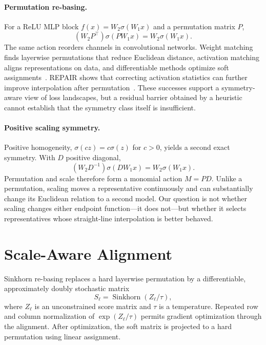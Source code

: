 \documentclass{article}
\begin{document}
\paragraph{Permutation re-basing.}
For a ReLU MLP block $f(x)=W_2\sigma(W_1x)$ and a permutation matrix $P$,
\begin{equation}
(W_2P^\top)\sigma(PW_1x)=W_2\sigma(W_1x).
\label{eq:perm}
\end{equation}
The same action reorders channels in convolutional networks.  Weight matching
finds layerwise permutations that reduce Euclidean distance, activation
matching aligns representations on data, and differentiable methods optimize
soft assignments~\citep{ainsworth2023git,guerrero2023rebasin}.  REPAIR shows
that correcting activation statistics can further improve interpolation after
permutation~\citep{jordan2023repair}.  These successes support a symmetry-aware
view of loss landscapes, but a residual barrier obtained by a heuristic cannot
establish that the symmetry class itself is insufficient.

\paragraph{Positive scaling symmetry.}
Positive homogeneity, $\sigma(cz)=c\sigma(z)$ for $c>0$, yields a second exact
symmetry.  With $D$ positive diagonal,
\begin{equation}
(W_2D^{-1})\sigma(DW_1x)=W_2\sigma(W_1x).
\label{eq:scale}
\end{equation}
Permutation and scale therefore form a monomial action $M=PD$.  Unlike a
permutation, scaling moves a representative continuously and can substantially
change its Euclidean relation to a second model.  Our question is not whether
scaling changes either endpoint function---it does not---but whether it selects
representatives whose straight-line interpolation is better behaved.

\section{Scale-Aware Alignment}
\label{sec:method}

Sinkhorn re-basing replaces a hard layerwise permutation by a differentiable,
approximately doubly stochastic matrix
\begin{equation}
S_\ell=\operatorname{Sinkhorn}(Z_\ell/\tau),
\end{equation}
where $Z_\ell$ is an unconstrained score matrix and $\tau$ is a temperature.
Repeated row and column normalization of $\exp(Z_\ell/\tau)$ permits gradient
optimization through the alignment.  After optimization, the soft matrix is
projected to a hard permutation using linear assignment.
\end{document}
